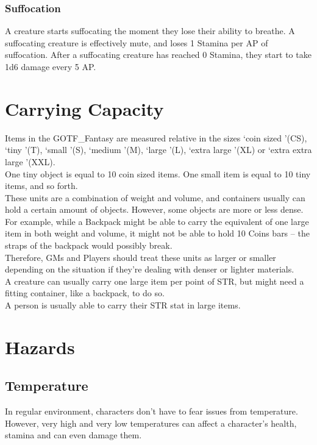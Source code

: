 \subsubsection{Suffocation}\label{subsubsec:suffocation}
A creature starts suffocating the moment they lose their ability to breathe.
A suffocating creature is effectively mute, and loses 1 Stamina per AP of suffocation.
After a suffocating creature has reached 0 Stamina, they start to take 1d6 damage every 5 AP.

\section{Carrying Capacity}\label{sec:carryingCapacity}
Items in the GOTF\_Fantasy are measured relative in the sizes \lq coin sized \rq (CS), \lq tiny \rq (T), \lq small \rq (S), \lq medium \rq (M), \lq large \rq (L), \lq extra large \rq (XL) or \lq extra extra large \rq (XXL).\\
One tiny object is equal to 10 coin sized items.
One small item is equal to 10 tiny items, and so forth.\\
These units are a combination of weight and volume, and containers usually can hold a certain amount of objects.
However, some objects are more or less dense.
For example, while a Backpack might be able to carry the equivalent of one large item in both weight and volume, it might not be able to hold 10 Coins bars -- the straps of the backpack would possibly break.\\
Therefore, GMs and Players should treat these units as larger or smaller depending on the situation if they're dealing with denser or lighter materials.\\
A creature can usually carry one large item per point of STR, but might need a fitting container, like a backpack, to do so.\\

A person is usually able to carry their STR stat in large items.\\

\section{Hazards}\label{sec:hazards}
\subsection{Temperature}\label{subsec:temperature}
In regular environment, characters don't have to fear issues from temperature.
However, very high and very low temperatures can affect a character's health, stamina and can even damage them.\\

